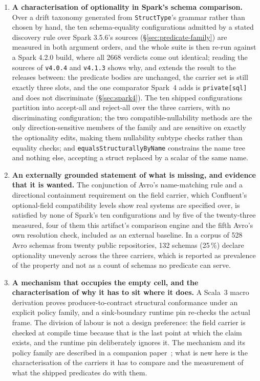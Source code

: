 \begin{enumerate}[leftmargin=1.5em]
  \item \textbf{A characterisation of optionality in Spark's schema comparison.} Over a drift taxonomy generated from \texttt{StructType}'s grammar rather than chosen by hand, the ten schema-equality configurations admitted by a stated discovery rule over Spark 3.5.6's sources (\S\ref{sec:predicate-family}) are measured in both argument orders, and the whole suite is then re-run against a Spark 4.2.0 build, where all 2668 verdicts come out identical; reading the sources of \texttt{v4.0.4} and \texttt{v4.1.3} shows why, and extends the result to the releases between: the predicate bodies are unchanged, the carrier set is still exactly three slots, and the one comparator Spark~4 adds is \texttt{private[sql]} and does not discriminate (\S\ref{sec:spark4}). The ten shipped configurations partition into accept-all and reject-all over the three carriers, with no discriminating configuration; the two compatible-nullability methods are the only direction-sensitive members of the family and are sensitive on exactly the optionality edits, making them nullability subtype checks rather than equality checks; and \texttt{equalsStructurallyByName} constrains the name tree and nothing else, accepting a struct replaced by a scalar of the same name.
  \item \textbf{An externally grounded statement of what is missing, and evidence that it is wanted.} The conjunction of Avro's name-matching rule and a directional containment requirement on the field carrier, which Confluent's optional-field compatibility levels show real systems are specified over, is satisfied by none of Spark's ten configurations and by five of the twenty-three measured, four of them this artifact's comparison engine and the fifth Avro's own resolution check, included as an external baseline. In a corpus of 528 Avro schemas from twenty public repositories, 132 schemas (25\,\%) declare optionality unevenly across the three carriers, which is reported as prevalence of the property and not as a count of schemas no predicate can serve.
  \item \textbf{A mechanism that occupies the empty cell, and the characterisation of why it has to sit where it does.} A Scala~3 macro derivation proves producer-to-contract structural conformance under an explicit policy family, and a sink-boundary runtime pin re-checks the actual frame. The division of labour is not a design preference: the field carrier is checked at compile time because that is the last point at which the claim exists, and the runtime pin deliberately ignores it. The mechanism and its policy family are described in a companion paper~\cite{mirji_shift_left_2026}; what is new here is the characterisation of the carriers it has to compare and the measurement of what the shipped predicates do with them.
\end{enumerate}

